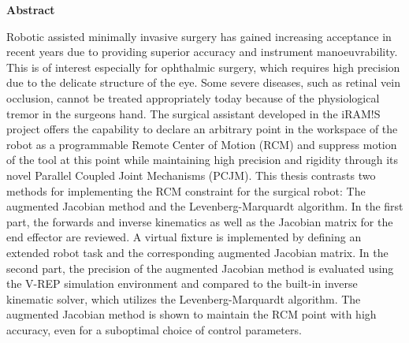 
\cleardoublepage

\vspace*{2cm}
\begin{center}
{\Large \textbf{Abstract}}
\end{center}
\vspace{1cm}
Robotic assisted minimally invasive surgery has gained increasing acceptance in recent years due to providing superior accuracy and instrument manoeuvrability. This is of interest especially for ophthalmic surgery, which requires high precision due to the delicate structure of the eye. Some severe diseases, such as retinal vein occlusion, cannot be treated appropriately today because of the physiological tremor in the surgeons hand. The surgical assistant developed in the iRAM!S project offers the capability to declare an arbitrary point in the workspace of the robot as a programmable Remote Center of Motion (RCM) and suppress motion of the tool at this point while maintaining high precision and rigidity through its novel Parallel Coupled Joint Mechanisms (PCJM).
This thesis contrasts two methods for implementing the RCM constraint for the surgical robot: The augmented Jacobian method and the Levenberg-Marquardt algorithm. In the first part, the forwards and inverse kinematics as well as the Jacobian matrix for the end effector are reviewed. A virtual fixture is implemented by defining an extended robot task and the corresponding augmented Jacobian matrix. In the second part, the precision of the augmented Jacobian method is evaluated using the V-REP simulation environment and compared to the built-in inverse kinematic solver, which utilizes the Levenberg-Marquardt algorithm. The augmented Jacobian method is shown to maintain the RCM point with high accuracy, even for a suboptimal choice of control parameters. 

